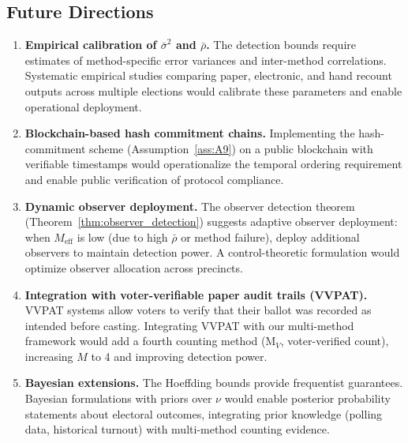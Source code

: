 \documentclass[11pt,a4paper]{article}
\theoremstyle{definition}
\newcommand{\method}[1]{\mathrm{M}_{#1}}
\begin{document}
\subsection{Future Directions}
\begin{enumerate}[label=(\roman*)]
    \item \textbf{Empirical calibration of $\bar{\sigma}^2$ and $\bar{\rho}$.} The detection bounds require estimates of method-specific error variances and inter-method correlations. Systematic empirical studies comparing paper, electronic, and hand recount outputs across multiple elections would calibrate these parameters and enable operational deployment.
    \item \textbf{Blockchain-based hash commitment chains.} Implementing the hash-commitment scheme (Assumption~\ref{ass:A9}) on a public blockchain with verifiable timestamps would operationalize the temporal ordering requirement and enable public verification of protocol compliance.
    \item \textbf{Dynamic observer deployment.} The observer detection theorem (Theorem~\ref{thm:observer_detection}) suggests adaptive observer deployment: when $M_{\text{eff}}$ is low (due to high $\bar{\rho}$ or method failure), deploy additional observers to maintain detection power. A control-theoretic formulation would optimize observer allocation across precincts.
    \item \textbf{Integration with voter-verifiable paper audit trails (VVPAT).} VVPAT systems allow voters to verify that their ballot was recorded as intended before casting. Integrating VVPAT with our multi-method framework would add a fourth counting method ($\method{V}$, voter-verified count), increasing $M$ to 4 and improving detection power.
    \item \textbf{Bayesian extensions.} The Hoeffding bounds provide frequentist guarantees. Bayesian formulations with priors over $\nu$ would enable posterior probability statements about electoral outcomes, integrating prior knowledge (polling data, historical turnout) with multi-method counting evidence.
\end{enumerate}
\end{document}
